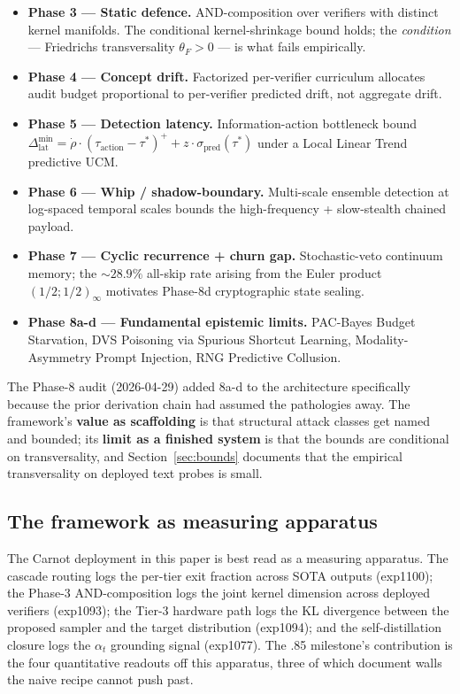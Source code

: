 \documentclass[10pt]{article}
\begin{document}
\begin{itemize}
  \item \textbf{Phase 3 --- Static defence.} AND-composition over
        verifiers with distinct kernel manifolds. The conditional
        kernel-shrinkage bound holds; the \emph{condition} ---
        Friedrichs transversality $\theta_F > 0$ --- is what fails
        empirically.
  \item \textbf{Phase 4 --- Concept drift.} Factorized per-verifier
        curriculum allocates audit budget proportional to per-verifier
        predicted drift, not aggregate drift.
  \item \textbf{Phase 5 --- Detection latency.} Information-action
        bottleneck bound
        $\Delta_{\mathrm{lat}}^{\min} = \dot{\rho} \cdot
        (\tau_{\mathrm{action}} - \tau^*)^+ + z \cdot
        \sigma_{\mathrm{pred}}(\tau^*)$ under a Local Linear Trend
        predictive UCM.
  \item \textbf{Phase 6 --- Whip / shadow-boundary.} Multi-scale
        ensemble detection at log-spaced temporal scales bounds the
        high-frequency + slow-stealth chained payload.
  \item \textbf{Phase 7 --- Cyclic recurrence + churn gap.}
        Stochastic-veto continuum memory; the $\sim 28.9\%$ all-skip
        rate arising from the Euler product
        $(1/2; 1/2)_{\infty}$ motivates Phase-8d cryptographic
        state sealing.
  \item \textbf{Phase 8a-d --- Fundamental epistemic limits.}
        PAC-Bayes Budget Starvation, DVS Poisoning via Spurious
        Shortcut Learning, Modality-Asymmetry Prompt Injection,
        RNG Predictive Collusion.
\end{itemize}

The Phase-8 audit (2026-04-29) added 8a-d to the architecture
specifically because the prior derivation chain had assumed the
pathologies away. The framework's \textbf{value as scaffolding} is
that structural attack classes get named and bounded; its
\textbf{limit as a finished system} is that the bounds are
conditional on transversality, and Section~\ref{sec:bounds}
documents that the empirical transversality on deployed text
probes is small.

\subsection{The framework as measuring apparatus}

The Carnot deployment in this paper is best read as a measuring
apparatus. The cascade routing logs the per-tier exit fraction
across SOTA outputs (exp1100); the Phase-3 AND-composition logs
the joint kernel dimension across deployed verifiers (exp1093);
the Tier-3 hardware path logs the KL divergence between the
proposed sampler and the target distribution (exp1094); and the
self-distillation closure logs the $\alpha_t$ grounding signal
(exp1077). The .85 milestone's contribution is the four
quantitative readouts off this apparatus, three of which document
walls the naive recipe cannot push past.
\end{document}
